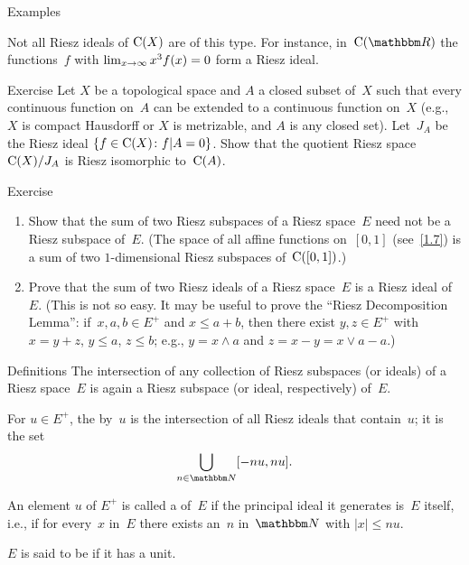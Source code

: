 \documentclass[main.tex]{subfiles}
\begin{document}
\begin{psec}{2.8}{Examples}
\begin{enumerate}
Not all Riesz ideals of $\mathrm{C}(X)$ are of this type.
For instance,
in~$\Cont{\R}$ the functions~$f$
with $\lim_{x\rightarrow \infty} x^3 f(x)=0$
form a Riesz ideal.
\end{enumerate}
\end{psec}
%
%
\begin{psec}{2.9}{Exercise}
Let $X$ be a topological space
and $A$ a closed subset of~$X$ 
such that every continuous function on~$A$
can be extended to a continuous function on~$X$ 
(e.g., $X$ is compact Hausdorff or $X$ is metrizable,
and $A$ is any closed set).
Let~$J_A$ be the Riesz ideal
$\{f\in\mathrm{C}(X)\colon f|A=0\}$.
Show that the quotient Riesz space
$\mathrm{C}(X)/J_A$ is Riesz isomorphic to~$\mathrm{C}(A)$.
\end{psec}
%
%
\begin{psec}{2.10}{Exercise}
\begin{enumerate}
\item \label{2.10-1}
Show that the sum of two Riesz subspaces 
of a Riesz space~$E$ need not be a Riesz subspace of~$E$.
(The space of all affine functions on~$[0,1]$ (see~\ref{1.7})
is a sum of two $1$-dimensional Riesz subspaces of~$\mathrm{C}([0,1])$.)
%
\item \label{2.10-2}
Prove that the sum of two Riesz ideals
of a Riesz space~$E$
is a Riesz ideal of~$E$.
(This is not so easy.
It may be useful to prove
the ``Riesz Decomposition Lemma'':
if~$x,a,b\in E^+$ and $x\leq a+b$,
then there exist $y,z\in E^+$ 
with $x=y+z$, $y\leq a$, $z\leq b$;
e.g., $y=x\wedge a$ and $z=x-y=x\vee a-a$.)
\end{enumerate}
\end{psec}
%
%
\begin{psec}{2.11}{Definitions}
The intersection of any collection of Riesz subspaces
(or ideals) of a Riesz space~$E$ 
is again a Riesz subspace
(or ideal, respectively)
of~$E$.

For $u\in E^+$, 
the  by~$u$ 
is the intersection of all Riesz ideals
that contain~$u$;
it is the set
\begin{equation*}
\bigcup_{n\in\N} [-nu,nu]
\htam{.}
\end{equation*}

An element $u$ of $E^+$
is called 
a  of~$E$
if the principal ideal it generates is~$E$ itself,
i.e., 
if for every~$x$ in~$E$
there exists an~$n$ in~$\N$ with $|x|\leq nu$.

$E$ is said to be  if it has a unit.
\end{psec}
\end{document}
